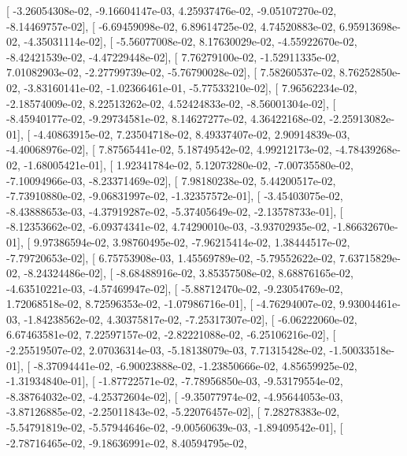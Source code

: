 \documentclass{article}
\begin{document}
       [ -3.26054308e-02,  -9.16604147e-03,   4.25937476e-02,
         -9.05107270e-02,  -8.14469757e-02],
       [ -6.69459098e-02,   6.89614725e-02,   4.74520883e-02,
          6.95913698e-02,  -4.35031114e-02],
       [ -5.56077008e-02,   8.17630029e-02,  -4.55922670e-02,
         -8.42421539e-02,  -4.47229448e-02],
       [  7.76279100e-02,  -1.52911335e-02,   7.01082903e-02,
         -2.27799739e-02,  -5.76790028e-02],
       [  7.58260537e-02,   8.76252850e-02,  -3.83160141e-02,
         -1.02366461e-01,  -5.77533210e-02],
       [  7.96562234e-02,  -2.18574009e-02,   8.22513262e-02,
          4.52424833e-02,  -8.56001304e-02],
       [ -8.45940177e-02,  -9.29734581e-02,   8.14627277e-02,
          4.36422168e-02,  -2.25913082e-01],
       [ -4.40863915e-02,   7.23504718e-02,   8.49337407e-02,
          2.90914839e-03,  -4.40068976e-02],
       [  7.87565441e-02,   5.18749542e-02,   4.99212173e-02,
         -4.78439268e-02,  -1.68005421e-01],
       [  1.92341784e-02,   5.12073280e-02,  -7.00735580e-02,
         -7.10094966e-03,  -8.23371469e-02],
       [  7.98180238e-02,   5.44200517e-02,  -7.73910880e-02,
         -9.06831997e-02,  -1.32357572e-01],
       [ -3.45403075e-02,  -8.43888653e-03,  -4.37919287e-02,
         -5.37405649e-02,  -2.13578733e-01],
       [ -8.12353662e-02,  -6.09374341e-02,   4.74290010e-03,
         -3.93702935e-02,  -1.86632670e-01],
       [  9.97386594e-02,   3.98760495e-02,  -7.96215414e-02,
          1.38444517e-02,  -7.79720653e-02],
       [  6.75753908e-03,   1.45569789e-02,  -5.79552622e-02,
          7.63715829e-02,  -8.24324486e-02],
       [ -8.68488916e-02,   3.85357508e-02,   8.68876165e-02,
         -4.63510221e-03,  -4.57469947e-02],
       [ -5.88712470e-02,  -9.23054769e-02,   1.72068518e-02,
          8.72596353e-02,  -1.07986716e-01],
       [ -4.76294007e-02,   9.93004461e-03,  -1.84238562e-02,
          4.30375817e-02,  -7.25317307e-02],
       [ -6.06222060e-02,   6.67463581e-02,   7.22597157e-02,
         -2.82221088e-02,  -6.25106216e-02],
       [ -2.25519507e-02,   2.07036314e-03,  -5.18138079e-03,
          7.71315428e-02,  -1.50033518e-01],
       [ -8.37094441e-02,  -6.90023888e-02,  -1.23850666e-02,
          4.85659925e-02,  -1.31934840e-01],
       [ -1.87722571e-02,  -7.78956850e-03,  -9.53179554e-02,
         -8.38764032e-02,  -4.25372604e-02],
       [ -9.35077974e-02,  -4.95644053e-03,  -3.87126885e-02,
         -2.25011843e-02,  -5.22076457e-02],
       [  7.28278383e-02,  -5.54791819e-02,  -5.57944646e-02,
         -9.00560639e-03,  -1.89409542e-01],
       [ -2.78716465e-02,  -9.18636991e-02,   8.40594795e-02,
\end{document}
